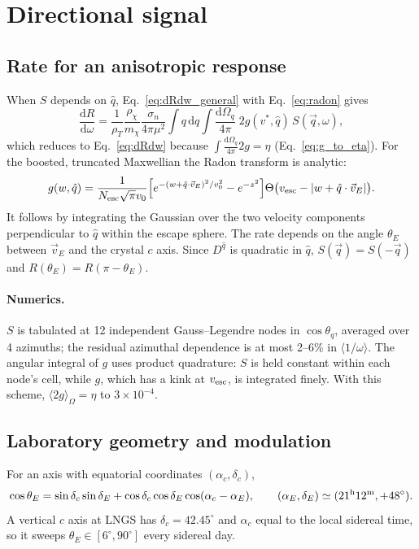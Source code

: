 \documentclass[11pt,a4paper]{article}
\numberwithin{equation}{section}
\newcommand{\qv}{\vec q}
\newcommand{\qh}{\hat q}
\newcommand{\dd}{\mathrm{d}}
\newcommand{\mchi}{m_\chi}
\newcommand{\avg}[1]{\langle #1\rangle}
\begin{document}
\section{Directional signal}
\label{sec:directional}
\subsection{Rate for an anisotropic response}
When $S$ depends on $\qh$, Eq.~\eqref{eq:dRdw_general} with Eq.~\eqref{eq:radon} gives
\begin{equation}
  \frac{\dd R}{\dd\omega}=\frac{1}{\rho_T}\frac{\rho_\chi}{\mchi}\frac{\sigma_n}{4\pi\mu^2}
  \int q\,\dd q\int\frac{\dd\Omega_q}{4\pi}\;2g(v^*,\qh)\,S(\qv,\omega),
\end{equation}
which reduces to Eq.~\eqref{eq:dRdw} because $\int\frac{\dd\Omega_q}{4\pi}2g=\eta$
(Eq.~\eqref{eq:g_to_eta}). For the boosted, truncated Maxwellian the Radon transform is
analytic:
\begin{equation}
  g(w,\qh)=\frac{1}{N_{\rm esc}\sqrt\pi v_0}\Big[e^{-(w+\qh\cdot\vec v_E)^2/v_0^2}-e^{-z^2}\Big]
  \Theta\big(v_{\rm esc}-|w+\qh\cdot\vec v_E|\big).
\end{equation}
It follows by integrating the Gaussian over the two velocity components perpendicular to
$\qh$ within the escape sphere. The rate depends on the angle $\theta_E$ between $\vec v_E$
and the crystal $c$ axis. Since $D^{\qh}$ is quadratic in $\qh$, $S(\qv)=S(-\qv)$ and
$R(\theta_E)=R(\pi-\theta_E)$.

\paragraph{Numerics.}
$S$ is tabulated at 12 independent Gauss--Legendre nodes in $\cos\theta_q$, averaged over 4
azimuths; the residual azimuthal dependence is at most 2--6\% in $\avg{1/\omega}$. The angular
integral of $g$ uses product quadrature: $S$ is held constant within each node's cell, while
$g$, which has a kink at $v_{\rm esc}$, is integrated finely. With this scheme,
$\avg{2g}_\Omega=\eta$ to $3\times10^{-4}$.

\subsection{Laboratory geometry and modulation}
For an axis with equatorial coordinates $(\alpha_c,\delta_c)$,
\begin{equation}
  \cos\theta_E=\sin\delta_c\sin\delta_E+\cos\delta_c\cos\delta_E\cos(\alpha_c-\alpha_E),
  \qquad(\alpha_E,\delta_E)\simeq(21^{\rm h}12^{\rm m},+48^\circ).
\end{equation}
A vertical $c$ axis at LNGS has $\delta_c=42.45^\circ$ and $\alpha_c$ equal to the local
sidereal time, so it sweeps $\theta_E\in[6^\circ,90^\circ]$ every sidereal day.
\end{document}
